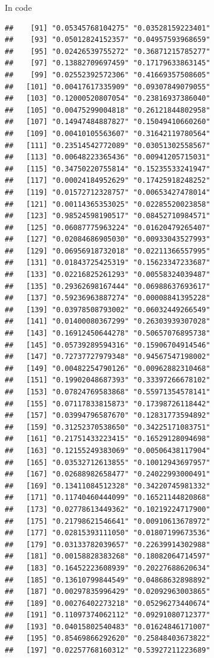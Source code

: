 \documentclass[ignorenonframetext,]{beamer}
\begin{document}
\begin{frame}[fragile]{In code}
\begin{verbatim}
##    [91] "0.05345768104275" "0.03528159223401"
##    [93] "0.05012824152357" "0.04957593968659"
##    [95] "0.02426539755272" "0.36871215785277"
##    [97] "0.13882709697459" "0.17179633863145"
##    [99] "0.02552392572306" "0.41669357508605"
##   [101] "0.00417617335909" "0.09307849079055"
##   [103] "0.12000520807054" "0.23816937386040"
##   [105] "0.00475299004818" "0.26121844802958"
##   [107] "0.14947484887827" "0.15049410660260"
##   [109] "0.00410105563607" "0.31642119780564"
##   [111] "0.23514542772089" "0.03051302558567"
##   [113] "0.00648223365436" "0.00941205715031"
##   [115] "0.34750220755814" "0.15235533241947"
##   [117] "0.00024184952629" "0.17425918248252"
##   [119] "0.01572712328757" "0.00653427478014"
##   [121] "0.00114365353025" "0.02285520023858"
##   [123] "0.98524598190517" "0.08452710984571"
##   [125] "0.06087775963224" "0.01620479265407"
##   [127] "0.02084686905030" "0.00933043527993"
##   [129] "0.06956918732018" "0.02211366557995"
##   [131] "0.01843725425319" "0.15623347233687"
##   [133] "0.02216825261293" "0.00558324039487"
##   [135] "0.29362698167444" "0.06988637693617"
##   [137] "0.59236963887274" "0.00008841395228"
##   [139] "0.03978508793002" "0.06032449266549"
##   [141] "0.01400080367299" "0.26303939307028"
##   [143] "0.16912450644278" "0.50657076895738"
##   [145] "0.05739289594316" "0.15906704914546"
##   [147] "0.72737727979348" "0.94567547198002"
##   [149] "0.00482254790126" "0.00962882310468"
##   [151] "0.19902048687393" "0.33397266678102"
##   [153] "0.07824769583868" "0.55971354578141"
##   [155] "0.07117833815873" "0.17398726118442"
##   [157] "0.03994796587670" "0.12831773594892"
##   [159] "0.31252370538650" "0.34225171083751"
##   [161] "0.21751433223415" "0.16529128094698"
##   [163] "0.12155249383069" "0.00506438117904"
##   [165] "0.03532712613855" "0.10012943697957"
##   [167] "0.02688982658477" "0.24022993000491"
##   [169] "0.13411084512328" "0.34220745981332"
##   [171] "0.11740460444099" "0.16521144820868"
##   [173] "0.02778613449362" "0.10219224717900"
##   [175] "0.21798621546641" "0.00910613678972"
##   [177] "0.02815393111050" "0.01807199673536"
##   [179] "0.03133782039657" "0.22639914302988"
##   [181] "0.00158828383268" "0.18082064714597"
##   [183] "0.16452223608939" "0.20227688620634"
##   [185] "0.13610799844549" "0.04868632898892"
##   [187] "0.00297835996429" "0.02092963003865"
##   [189] "0.00276402273218" "0.05296273440674"
##   [191] "0.11097374062112" "0.09291080712377"
##   [193] "0.04015802540483" "0.01624846171007"
##   [195] "0.85469866292620" "0.25848403673822"
##   [197] "0.02257768160312" "0.53927211223689"

\end{verbatim}
\end{frame}
\end{document}
